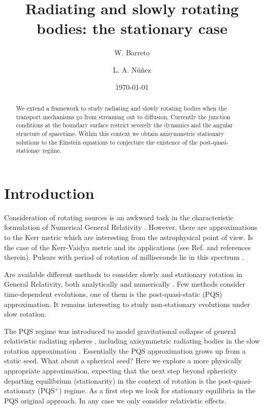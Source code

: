 \documentclass[twocolumn,superscriptaddress]{revtex4}
\begin{document}
\title{Radiating and slowly rotating bodies: the stationary case}
\author{W. Barreto}
\author{L. A. N\'u\~nez}
\date{\today}
\begin{abstract}
We extend a framework to study radiating and slowly rotating bodies when the transport mechanisms go from streaming out to diffusion. Currently the junction conditions at the boundary surface restrict severely the dynamics and the angular structure of spacetime. Within this context we obtain axisymmetric stationary solutions to the Einstein equations to conjecture the existence of the {post-quasi-stationay} regime.
\end{abstract}
\maketitle
\section{Introduction}
Consideration of rotating sources is an awkward task in the characteristic formulation of Numerical General Relativity \cite{w12, bv06, pi98}. However, there are approximations to the Kerr metric which are interesting from the astrophysical point of view. Is the case of the Kerr-Vaidya metric \cite{ck77} and its applications (see Ref. \cite{hmnp94} and references therein). Pulsars with period of rotation of milliseconds lie in this spectrum \cite{bk90,wgw91}.  

Are available different methods to consider slowly and stationary rotation in General Relativity, both analytically and numerically \cite{h67,ht68}. Few methods consider time-dependent evolutions, one of them is the post-quasi-static (PQS) approximation. It remains interesting to study non-stationary evolutions under slow rotation. 

The PQS regime was introduced to model gravitational collapse of general relativistic radiating spheres \cite{hjr80,hbds02}, including axisymmetric radiating bodies in the slow rotation approximation \cite{hmnp94}. Essentially the PQS approximation grows up from a static seed. What about a spherical seed? Here we explore a more physically appropriate approximation, expecting that the next step beyond sphericity departing equilibrium (stationarity) in the context of rotation is the post-quasi-stationaty (PQS$^+$) regime. As a first step we look for stationary equilibria in the PQS original approach. In any case we only consider relativistic effects.
\end{document}
